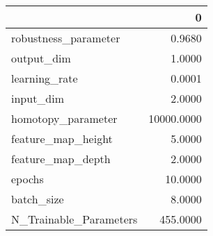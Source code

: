 \begin{tabular}{lr}
\toprule
{} &           0 \\
\midrule
robustness\_parameter   &      0.9680 \\
output\_dim             &      1.0000 \\
learning\_rate          &      0.0001 \\
input\_dim              &      2.0000 \\
homotopy\_parameter     &  10000.0000 \\
feature\_map\_height     &      5.0000 \\
feature\_map\_depth      &      2.0000 \\
epochs                 &     10.0000 \\
batch\_size             &      8.0000 \\
N\_Trainable\_Parameters &    455.0000 \\
\bottomrule
\end{tabular}
